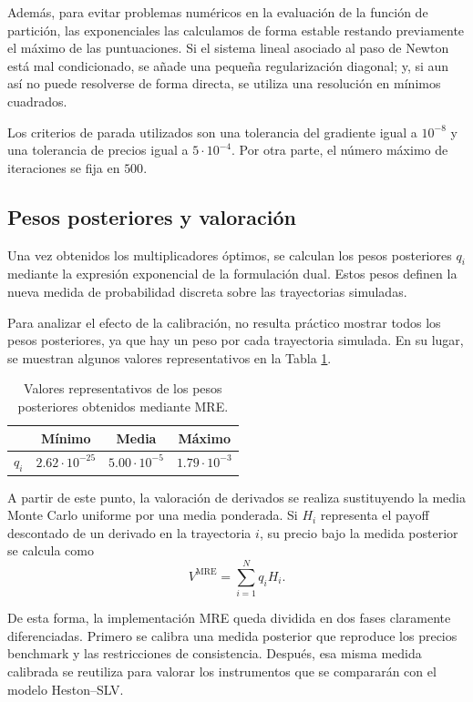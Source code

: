 Además, para evitar problemas numéricos en la evaluación de la función de partición, las exponenciales las calculamos de forma estable restando previamente el máximo de las puntuaciones. Si el sistema lineal asociado al paso de Newton está mal condicionado, se añade una pequeña regularización diagonal; y, si aun así no puede resolverse de forma directa, se utiliza una resolución en mínimos cuadrados.\medskip

Los criterios de parada utilizados son una tolerancia del gradiente igual a \(10^{-8}\) y una tolerancia de precios igual a \(5\cdot 10^{-4}\). Por otra parte, el número máximo de iteraciones se fija en \(500\).

\subsection{Pesos posteriores y valoración}

Una vez obtenidos los multiplicadores óptimos, se calculan los pesos posteriores \(q_i\) mediante la expresión exponencial de la formulación dual. Estos pesos definen la nueva medida de probabilidad discreta sobre las trayectorias simuladas.

Para analizar el efecto de la calibración, no resulta práctico mostrar todos los pesos posteriores, ya que hay un peso por cada trayectoria simulada. En su lugar, se muestran algunos valores representativos en la Tabla \ref{tab:pesos_mre}. 

\begin{table}[H]
\centering
\begin{tabular}{c|ccc}
\hline
 & Mínimo & Media & Máximo \\
\hline
\(q_i\)
& \(2.62\cdot 10^{-25}\)
& \(5.00\cdot 10^{-5}\)
& \(1.79\cdot 10^{-3}\) \\
\hline
\end{tabular}
\caption{Valores representativos de los pesos posteriores obtenidos mediante MRE.}
\label{tab:pesos_mre}
\end{table}

A partir de este punto, la valoración de derivados se realiza sustituyendo la media Monte Carlo uniforme por una media ponderada. Si \(H_i\) representa el payoff descontado de un derivado en la trayectoria \(i\), su precio bajo la medida posterior se calcula como
\[
V^{\mathrm{MRE}}
=
\sum_{i=1}^{N} q_i H_i.
\]

De esta forma, la implementación MRE queda dividida en dos fases claramente diferenciadas. Primero se calibra una medida posterior que reproduce los precios benchmark y las restricciones de consistencia. Después, esa misma medida calibrada se reutiliza para valorar los instrumentos que se compararán con el modelo Heston--SLV.\medskip

